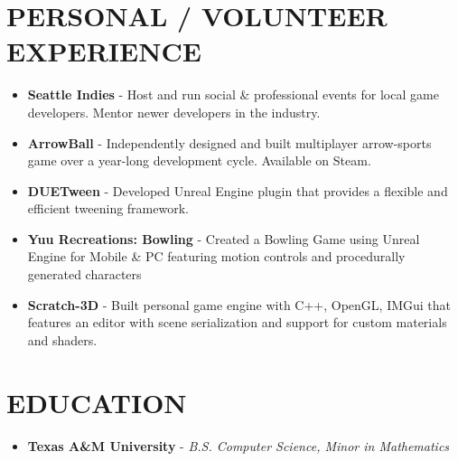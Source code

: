 \documentclass[resmargin,10pt]{res} %
\begin{document}
\begin{resume}
    \section{PERSONAL / VOLUNTEER EXPERIENCE}
    \begin{itemize}
        \setlength\itemsep{-0.0em}
        \item \textbf{Seattle Indies} - Host and run social \& professional events for local game developers. Mentor newer developers in the industry.
        \item \textbf{ArrowBall} - Independently designed and built multiplayer arrow-sports game over a year-long development cycle. Available on Steam.
        \item \textbf{DUETween} - Developed Unreal Engine plugin that provides a flexible and efficient tweening framework.
        \item \textbf{Yuu Recreations: Bowling} - Created a Bowling Game using Unreal Engine for Mobile \& PC featuring motion controls and procedurally generated characters
        \item \textbf{Scratch-3D} - Built personal game engine with C++, OpenGL, IMGui that features an editor with scene serialization and support for custom materials and shaders.
    \end{itemize}

    \section{EDUCATION}
    \begin{itemize}
        \setlength\itemsep{0.1em}
        \item[] {\bf Texas A\&M University} - \textit{B.S. Computer Science, Minor in Mathematics}
    \end{itemize}
\end{resume}
\end{document}
